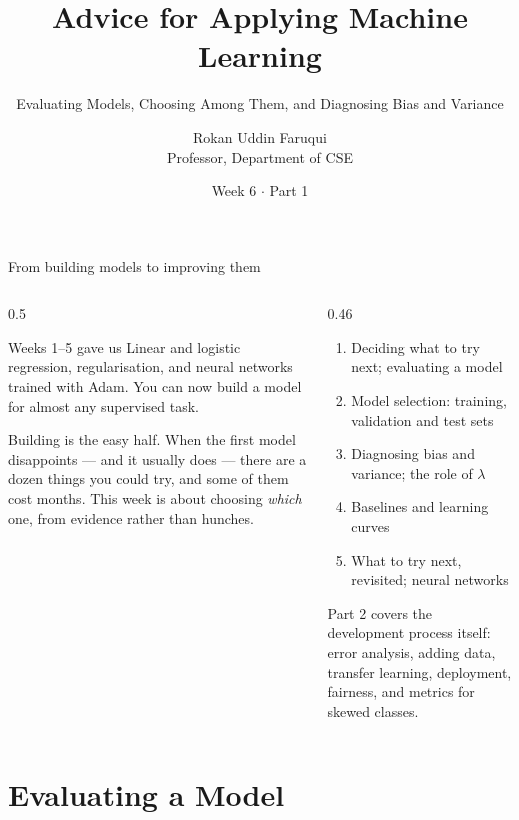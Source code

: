 \documentclass[aspectratio=169,10pt]{beamer}
\title[CSE 815 -- Week 6, Part 1]{Advice for Applying Machine Learning}
\subtitle{Evaluating Models, Choosing Among Them, and Diagnosing Bias and Variance}
\author{Rokan Uddin Faruqui\\ \small Professor, Department of CSE}
\institute{\small University of Chittagong \\ \texttt{rufaruqui@cu.ac.bd}}
\date[Week 6 / Part 1]{Week 6 $\cdot$ Part 1}
\begin{document}
\begin{frame}
  \titlepage
\end{frame}

\begin{frame}{From building models to improving them}
  \begin{columns}[T,onlytextwidth]
    \begin{column}{0.5\textwidth}
      \begin{block}{Weeks 1--5 gave us}
        \footnotesize
        Linear and logistic regression, regularisation, and neural networks trained with
        Adam. You can now build a model for almost any supervised task.
      \end{block}
      \footnotesize
      Building is the easy half. When the first model disappoints --- and it usually does ---
      there are a dozen things you could try, and some of them cost months. This week is
      about choosing \emph{which} one, from evidence rather than hunches.
    \end{column}
    \begin{column}{0.46\textwidth}
      \begin{keyidea}[Today]
        \footnotesize
        \begin{enumerate}
          \item Deciding what to try next; evaluating a model
          \item Model selection: training, validation and test sets
          \item Diagnosing bias and variance; the role of $\lambda$
          \item Baselines and learning curves
          \item What to try next, revisited; neural networks
        \end{enumerate}
      \end{keyidea}
      \footnotesize Part 2 covers the development process itself: error analysis, adding
      data, transfer learning, deployment, fairness, and metrics for skewed classes.
    \end{column}
  \end{columns}
\end{frame}

\section{Evaluating a Model}
\end{document}
